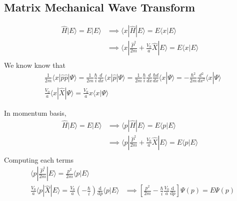 \documentclass[letterpaper]{article}
\newcommand{\hb}{\hbar}
\begin{document}
\subsection*{Matrix Mechanical Wave Transform} 
\begin{align*}
	\hat{H} | E \rangle  = E | E \rangle  &\implies 
\langle x |  \hat{H} | E \rangle  = E \langle x |  E \rangle 
	\\
					      &\implies \langle x |  \frac{\hat{P}^2}{2m} + \frac{V_0}{a} \hat{X} | E \rangle  = E \langle x |  E \rangle  \\ 
\end{align*}
We know know that 
\begin{align*}&
	\frac{1}{2 m}\langle x|\hat{p} \hat{p}| \Psi\rangle=\frac{1}{2 m} \frac{\hbar}{i} \frac{d}{d x}\langle x|\hat{p}| \Psi\rangle=\frac{1}{2 m} \frac{\hbar}{i} \frac{d}{d x} \frac{\hbar d}{d x}\langle x | \Psi\rangle=-\frac{\hbar^{2}}{2 m} \frac{d^{2}}{d x^{2}}\langle x | \Psi\rangle \\ 
	& \frac{V_0}{a} \langle x | \hat{X} | \Psi \rangle 
= \frac{V_0}{a} x \langle x | \Psi \rangle 
\end{align*}

In momentum basis, 
\begin{align*}
	\hat{H} | E \rangle  = E | E \rangle  &\implies 
\langle p |  \hat{H} | E \rangle  = E \langle p |  E \rangle 
	\\
					      &\implies \langle p |  \frac{\hat{P}^2}{2m} + \frac{V_0}{a} \hat{X} | E \rangle  = E \langle p |  E \rangle  \\ 
\end{align*} 
Computing each terms 
\begin{align*}
	& \langle p | \frac{\hat{P}^2 }{2m} | E \rangle  = \frac{p^2}{2m} \langle p | E \rangle  \\ &
\frac{V_0}{a}	\langle p | \hat{X} | E \rangle  = \frac{V_0}{a} \left(- \frac{\hb}{i}\right)\frac{\mathrm{d} }{\mathrm{d} p} \langle p | E \rangle
	&\implies 
	\left[
\frac{p^2}{2m} - \frac{\hb
}{i} \frac{V_0}{a} \frac{\mathrm{d} }{\mathrm{d} p}
	\right] \Psi(p) = E \Psi(p)
\end{align*}
\end{document}
